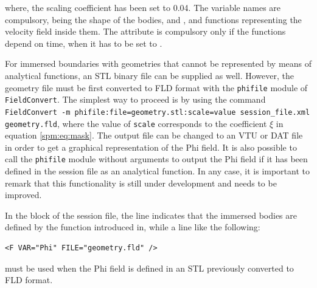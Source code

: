 where, the scaling coefficient has been set to 0.04. The variable names are compulsory, being  the shape of the bodies, and ,  and  functions representing the velocity field inside them. The attribute  is compulsory only if the functions depend on time, when it has to be set to .

For immersed boundaries with geometries that cannot be represented by means of analytical functions, an STL binary file can be supplied as well. However, the geometry file must be first converted to FLD format with the \texttt{phifile} module of \texttt{FieldConvert}. The simplest way to proceed is by using the command \texttt{FieldConvert -m phifile:file=geometry.stl:scale=value session_file.xml geometry.fld}, where the value of \texttt{scale} corresponds to the coefficient $\xi$ in equation \eqref{spm:eq:mask}. The output file can be changed to an VTU or DAT file in order to get a graphical representation of the Phi field. It is also possible to call the \texttt{phifile} module without arguments to output the Phi field if it has been defined in the session file as an analytical function. In any case, it is important to remark that this functionality is still under development and needs to be improved.

In the  block of the session file, the line  indicates that the immersed bodies are defined by the function introduced in, while a line like the following:

\begin{lstlisting}[style=XMLStyle]
    <F VAR="Phi" FILE="geometry.fld" />
\end{lstlisting}

must be used when the Phi field is defined in an STL previously converted to FLD format.
